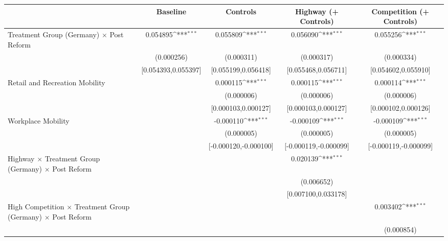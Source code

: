 {
\def\sym#1{\ifmmode^{#1}\else\(^{#1}\)\fi}
\begin{tabular}{l*{4}{c}}
\toprule
                    &\multicolumn{1}{c}{Baseline}&\multicolumn{1}{c}{Controls}&\multicolumn{1}{c}{Highway (+ Controls)}&\multicolumn{1}{c}{Competition (+ Controls)}\\
\midrule
Treatment Group (Germany) $\times$ Post Reform&    0.054895\sym{***}&    0.055809\sym{***}&    0.056090\sym{***}&    0.055256\sym{***}\\
                    &  (0.000256)         &  (0.000311)         &  (0.000317)         &  (0.000334)         \\
                    &[0.054393,0.055397]         &[0.055199,0.056418]         &[0.055468,0.056711]         &[0.054602,0.055910]         \\
Retail and Recreation Mobility&                     &    0.000115\sym{***}&    0.000115\sym{***}&    0.000114\sym{***}\\
                    &                     &  (0.000006)         &  (0.000006)         &  (0.000006)         \\
                    &                     &[0.000103,0.000127]         &[0.000103,0.000127]         &[0.000102,0.000126]         \\
Workplace Mobility  &                     &   -0.000110\sym{***}&   -0.000109\sym{***}&   -0.000109\sym{***}\\
                    &                     &  (0.000005)         &  (0.000005)         &  (0.000005)         \\
                    &                     &[-0.000120,-0.000100]         &[-0.000119,-0.000099]         &[-0.000119,-0.000099]         \\
Highway $\times$ Treatment Group (Germany) $\times$ Post Reform&                     &                     &    0.020139\sym{***}&                     \\
                    &                     &                     &  (0.006652)         &                     \\
                    &                     &                     &[0.007100,0.033178]         &                     \\
High Competition $\times$ Treatment Group (Germany) $\times$ Post Reform&                     &                     &                     &    0.003402\sym{***}\\
                    &                     &                     &                     &  (0.000854)         \\

\end{tabular}}
